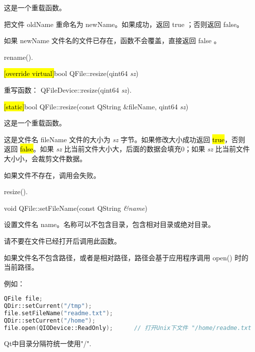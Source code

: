 这是一个重载函数。

把文件 oldName 重命名为 newName。如果成功，返回 true ；否则返回 false。


\begin{notice}
如果 newName 文件名的文件已存在，函数不会覆盖，直接返回 false 。
\end{notice}



\begin{notice}[另请参阅]
rename().
\end{notice}

\hl{[override virtual]}bool QFile::resize(qint64 \emph{sz})

重写函数： QFileDevice::resize(qint64 \emph{sz}).

\hl{[static]}bool QFile::resize(const QString \&fileName, qint64 \emph{sz})

这是一个重载函数。

这是文件名 fileName 文件的大小为 \emph{sz} 字节。如果修改大小成功返回 \hl{true}，否则返回 \hl{false}。如果 \emph{sz} 比当前文件大小大，后面的数据会填充0；如果 \emph{sz} 比当前文件大小小，会裁剪文件数据。



\begin{notice}[警告]
如果文件不存在，调用会失败。
\end{notice}

\begin{notice}[另请参阅]
resize().
\end{notice}

void QFile::setFileName(const QString \emph{\&name})

设置文件名 name。名称可以不包含目录，包含相对目录或绝对目录。

请不要在文件已经打开后调用此函数。

如果文件名不包含路径，或者是相对路径，路径会基于应用程序调用 open() 时的当前路径。

例如：

\begin{lstlisting}[language=C++]
QFile file;
QDir::setCurrent("/tmp");
file.setFileName("readme.txt");
QDir::setCurrent("/home");
file.open(QIODevice::ReadOnly);      // 打开Unix下文件 "/home/readme.txt"
\end{lstlisting}



\begin{notice}
Qt中目录分隔符统一使用"/".
\end{notice}

